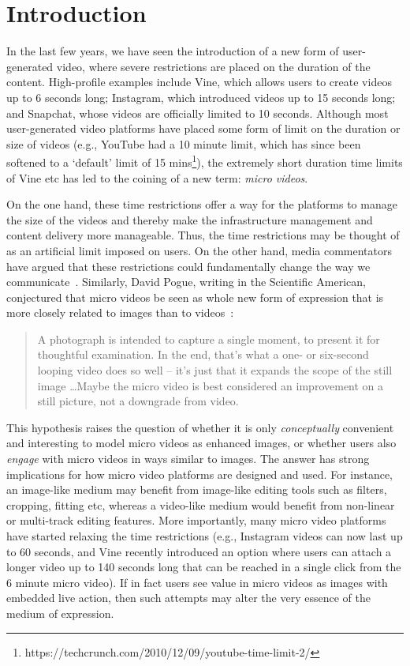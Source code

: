 \section{Introduction}

In the last few years, we have seen the introduction of a new form of user-generated video, where severe restrictions are placed on the duration of the content. High-profile examples include Vine, which allows users to create videos up to 6 seconds long; Instagram, which introduced videos up to 15 seconds long; and Snapchat, whose videos are officially limited to 10 seconds. Although most user-generated video platforms have placed some form of limit on the duration or size of videos (e.g., YouTube had a 10 minute limit, which has since been softened to a `default' limit of 15 mins\footnote{https://techcrunch.com/2010/12/09/youtube-time-limit-2/}), the extremely short duration time limits of Vine etc has led to the coining of a new term: \emph{micro videos}. 

On the one hand, these time restrictions offer a way for the platforms to manage the size of the videos and  thereby make the infrastructure management and content delivery more manageable. Thus, the time restrictions may be thought of as an artificial limit imposed on users. On the other hand, media commentators have argued that these restrictions could fundamentally change the way we communicate~\cite{bbc}. Similarly, David Pogue, writing in the Scientific American, conjectured that micro videos be seen as whole new form of expression that is more closely related to images than to videos~\cite{pogue13}:
\begin{quotation}
	A photograph is intended to capture a single moment, to present it for thoughtful examination. In the end, that's what a one- or six-second looping video does so well -- it's just that it expands the scope of the still image \ldots Maybe the micro video is best considered an improvement on a still picture, not a downgrade from video.
\end{quotation}

This  hypothesis raises the question of whether it is only \emph{conceptually} convenient and interesting to model  micro videos as enhanced images, or whether users also \emph{engage} with micro videos in ways similar to images. The answer has strong implications for how micro video platforms are designed and used. For instance,  an image-like medium may benefit from image-like editing tools such as filters, cropping, fitting etc, whereas a video-like medium would benefit from non-linear or multi-track editing features. More importantly, many micro video platforms have started relaxing the time restrictions (e.g., Instagram videos can now last up to 60 seconds, and Vine recently introduced an option where users can attach a longer video up to 140 seconds long that can be reached in a single click from the 6 minute micro video). If in fact users see value in micro videos as images with embedded live action, then such attempts may alter  the very essence of the medium of expression. 

